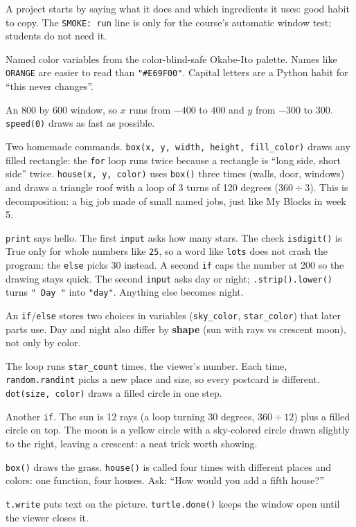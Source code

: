 \documentclass[level=1,teacher]{kidscode}
\begin{document}
\begin{description}[leftmargin=0pt,itemsep=5pt,font=\bfseries]
\item[Top comments.] A project starts by saying what it does and which ingredients it uses: good
  habit to copy. The \texttt{SMOKE: run} line is only for the course's automatic window test; students do not need it.
\item[PART 1: Colors.] Named color variables from the color-blind-safe Okabe-Ito palette.
  Names like \texttt{ORANGE} are easier to read than \texttt{"\#E69F00"}. Capital letters are a
  Python habit for \enquote{this never changes}.
\item[PART 2: Screen and turtle.] An 800 by 600 window, so $x$ runs from $-400$ to $400$ and $y$
  from $-300$ to $300$. \texttt{speed(0)} draws as fast as possible.
\item[PART 3: Functions.] Two homemade commands. \texttt{box(x, y, width, height, fill\_color)}
  draws any filled rectangle: the \texttt{for} loop runs twice because a rectangle is \enquote{long
  side, short side} twice. \texttt{house(x, y, color)} uses \texttt{box()} three times (walls, door,
  windows) and draws a triangle roof with a loop of 3 turns of 120 degrees ($360 \div 3$). This is
  decomposition: a big job made of small named jobs, just like My Blocks in week 5.
\item[PART 4: Greet and ask.] \texttt{print} says hello. The first \texttt{input} asks how many stars.
  The check \texttt{isdigit()} is True only for whole numbers like \texttt{25}, so a word like
  \texttt{lots} does not crash the program: the \texttt{else} picks 30 instead. A second \texttt{if}
  caps the number at 200 so the drawing stays quick. The second \texttt{input} asks day or night;
  \texttt{.strip().lower()} turns \texttt{" Day "} into \texttt{"day"}. Anything else becomes night.
\item[PART 5: Choose colors.] An \texttt{if}/\texttt{else} stores two choices in variables
  (\texttt{sky\_color}, \texttt{star\_color}) that later parts use. Day and night also differ by
  \textbf{shape} (sun with rays vs crescent moon), not only by color.
\item[PART 6: Random stars.] The loop runs \texttt{star\_count} times, the viewer's number. Each time,
  \texttt{random.\allowbreak randint} picks a new place and size, so every postcard is different.
  \texttt{dot(size, color)} draws a filled circle in one step.
\item[PART 7: Sun or moon.] Another \texttt{if}. The sun is 12 rays (a loop turning 30 degrees,
  $360 \div 12$) plus a filled circle on top. The moon is a yellow circle with a sky-colored circle
  drawn slightly to the right, leaving a crescent: a neat trick worth showing.
\item[PART 8: Grass and houses.] \texttt{box()} draws the grass. \texttt{house()} is called four times
  with different places and colors: one function, four houses. Ask: \enquote{How would you add a fifth house?}
\item[PART 9: Message.] \texttt{t.write} puts text on the picture. \texttt{turtle.done()} keeps the
  window open until the viewer closes it.
\end{description}
\end{document}
